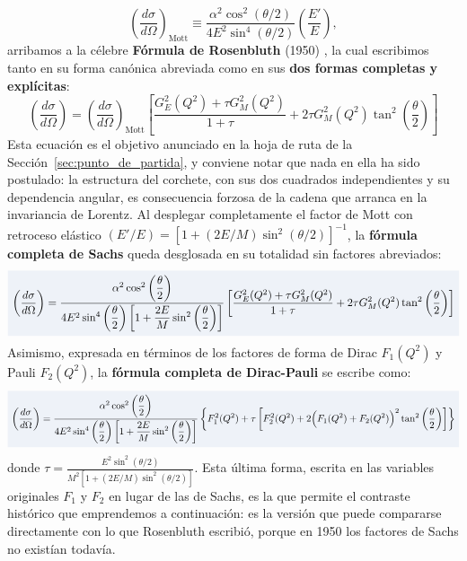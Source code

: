 \documentclass[10pt,a4paper]{article}
\newcommand{\dest}[1]{{\setlength{\fboxsep}{4pt}\colorbox{colordest}{$\displaystyle #1$}}}
\begin{document}
\begin{equation}
\left( \frac{d\sigma}{d\Omega} \right)_{\text{Mott}} \equiv \frac{\alpha^2 \cos^2(\theta/2)}{4 E^2 \sin^4(\theta/2)} \left( \frac{E'}{E} \right),
\label{eq:mott_def}
\end{equation}
arribamos a la célebre \textbf{Fórmula de Rosenbluth} (1950) \cite{rosenbluth1950}, la cual escribimos tanto en su forma canónica abreviada como en sus \textbf{dos formas completas y explícitas}:
\begin{equation}
\boxed{
\left( \frac{d\sigma}{d\Omega} \right) = \left( \frac{d\sigma}{d\Omega} \right)_{\text{Mott}} \left[ \frac{G_E^2(Q^2) + \tau G_M^2(Q^2)}{1+\tau} + 2\tau G_M^2(Q^2) \tan^2\left(\frac{\theta}{2}\right) \right]
}
\label{eq:rosenbluth_formula_box}
\end{equation}
Esta ecuación es el objetivo anunciado en la hoja de ruta de la Sección~\ref{sec:punto_de_partida}, y conviene notar que nada en ella ha sido postulado: la estructura del corchete, con sus dos cuadrados independientes y su dependencia angular, es consecuencia forzosa de la cadena que arranca en la invariancia de Lorentz. Al desplegar completamente el factor de Mott con retroceso elástico $(E'/E) = [1 + (2E/M)\sin^2(\theta/2)]^{-1}$, la \textbf{fórmula completa de Sachs} queda desglosada en su totalidad sin factores abreviados:
\begin{equation}
\dest{
\left(\frac{d\sigma}{d\Omega}\right) = \frac{\alpha^2 \cos^2\left(\dfrac{\theta}{2}\right)}{4 E^2 \sin^4\left(\dfrac{\theta}{2}\right) \left[ 1 + \dfrac{2E}{M}\sin^2\left(\dfrac{\theta}{2}\right) \right]} \left[ \frac{G_E^2(Q^2) + \tau G_M^2(Q^2)}{1+\tau} + 2\tau G_M^2(Q^2) \tan^2\left(\frac{\theta}{2}\right) \right]
}
\label{eq:rosenbluth_complete_sachs_sec5}
\end{equation}
Asimismo, expresada en términos de los factores de forma de Dirac $F_1(Q^2)$ y Pauli $F_2(Q^2)$, la \textbf{fórmula completa de Dirac-Pauli} se escribe como:
\begin{equation}
\dest{
\left(\frac{d\sigma}{d\Omega}\right) = \frac{\alpha^2 \cos^2\left(\dfrac{\theta}{2}\right)}{4 E^2 \sin^4\left(\dfrac{\theta}{2}\right) \left[ 1 + \dfrac{2E}{M}\sin^2\left(\dfrac{\theta}{2}\right) \right]} \left\{ F_1^2(Q^2) + \tau \left[ F_2^2(Q^2) + 2\Big( F_1(Q^2) + F_2(Q^2) \Big)^2 \tan^2\left(\frac{\theta}{2}\right) \right] \right\}
}
\label{eq:rosenbluth_complete_dirac_sec5}
\end{equation}
donde $\tau = \frac{E^2 \sin^2(\theta/2)}{M^2 [1 + (2E/M)\sin^2(\theta/2)]}$. Esta última forma, escrita en las variables originales $F_1$ y $F_2$ en lugar de las de Sachs, es la que permite el contraste histórico que emprendemos a continuación: es la versión que puede compararse directamente con lo que Rosenbluth escribió, porque en 1950 los factores de Sachs no existían todavía.
\end{document}
